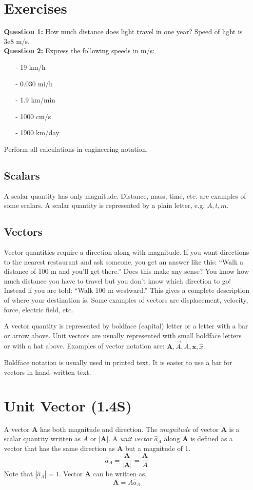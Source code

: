 \documentclass[12pt,a4paper]{article}
\begin{document}
\section{Exercises}
\noindent\textbf{Question 1:} How much distance does light travel in one year? Speed of light is $3\mathrm{e}8$ m/s.\\
\noindent\textbf{Question 2:} Express the following speeds in m/s:\\
\begin{enumerate}
\item[-] 19 km/h
\item[-] 0.030 mi/h
\item[-] 1.9 km/min
\item[-] 1000 cm/s
\item[-] 1900 km/day
\end{enumerate}
Perform all calculations in engineering notation.
\subsection{Scalars}
A scalar quantity has only magnitude. Distance, mass, time, etc. are examples of some scalars. A scalar quantity is represented by a plain letter, e.g, $A, t, m$.
\subsection{Vectors}
Vector quantities require a direction along with magnitude. If you want directions to the nearest restaurant and ask someone, you get an answer like this: ``Walk a distance of 100 m and you'll get there.'' Does this make any sense? You know how much distance you have to travel but you don't know which direction to go! Instead if you are told: ``Walk 100 m westward.'' This gives a complete description of where your destination is. Some examples of vectors are displacement, velocity, force, electric field, etc.

A vector quantity is represented by boldface (capital) letter or a letter with a bar or arrow above. Unit  vectors are usually represented with small boldface letters or with a hat above. Examples of vector notation are: $\textbf{{A}}, \vec{A}, \bar{A}, \textbf{x}, \hat{x}$.

Boldface notation is usually used in printed text. It is easier to use a bar for vectors in hand--written text.
\section{Unit Vector (1.4S)}
A vector \textbf{A} has both magnitude and direction. The \textit{magnitude} of vector \textbf{A} is a scalar quantity written as $A$ or $|\textbf{A}|$. A \textit{unit vector} $\hat{a}_A$ along \textbf{A} is defined as a vector that has the same direction as \textbf{A} but a magnitude of 1.
\begin{equation}
\hat{a}_A=\dfrac{\textbf{A}}{|\textbf{A}|}=\dfrac{\textbf{A}}{A}
\end{equation}
Note that $|\hat{a}_A|=1$. Vector \textbf{A} can be written as,
\begin{equation}
\textbf{A}=A\hat{a}_A
\end{equation}
\end{document}

